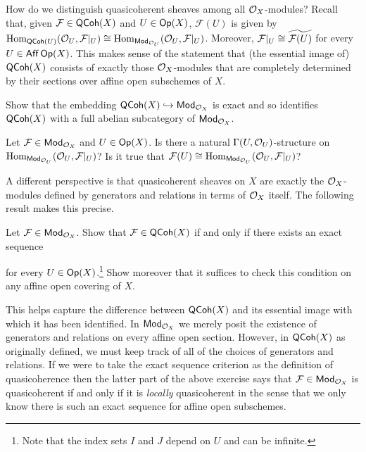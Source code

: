 \documentclass[11pt]{article}
\renewcommand{\F}{\mathcal{F}}
\begin{document}
How do we distinguish quasicoherent sheaves among all $\mathcal{O}_X$-modules? Recall that, given $\F\in\QCoh(X)$ and $U\in\operatorname{\mathsf{Op}}(X)$, $\F(U)$ is given by $\Hom_{\QCoh(U)}(\O_U,\F|_U)\iso\Hom_{\Mod_{\O_U}}(\O_U,\F|_U)$. Moreover, $\F|_U\iso\twid{\F(U)}$ for every $U\in\operatorname{\mathsf{Aff}}\operatorname{\mathsf{Op}}(X)$. This makes sense of the statement that (the essential image of) $\operatorname{\mathsf{QCoh}}(X)$ consists of exactly those $\mathcal{O}_X$-modules that are completely determined by their sections over affine open subschemes of $X$. 

\begin{exercise}
Show that the embedding $\operatorname{\mathsf{QCoh}}(X)\hookrightarrow\operatorname{\mathsf{Mod}}_{\mathcal{O}_X}$ is exact and so identifies $\operatorname{\mathsf{QCoh}}(X)$ with a full abelian subcategory of $\operatorname{\mathsf{Mod}}_{\mathcal{O}_X}$.
\end{exercise}

\begin{exercise}
Let $\F\in\Mod_{\O_X}$ and $U\in\operatorname{\mathsf{Op}}(X)$. Is there a natural $\Gamma(U,\mathcal{O}_U)$-structure on $\Hom_{\Mod_{\O_U}}(\O_U,\F|_U)$? Is it true that $\F(U)\iso\Hom_{\Mod_{\O_U}}(\O_U,\F|_U)$?
\end{exercise}

A different perspective is that quasicoherent sheaves on $X$ are exactly the $\mathcal{O}_X$-modules defined by generators and relations in terms of $\mathcal{O}_X$ itself. The following result makes this precise.

\begin{exercise}
Let $\F\in\Mod_{\O_X}$. Show that $\F\in\QCoh(X)$ if and only if there exists an exact sequence
\begin{center}
\end{center}
for every $U\in\operatorname{\mathsf{Op}}(X)$.\footnote{Note that the index sets $I$ and $J$ depend on $U$ and can be infinite.} Show moreover that it suffices to check this condition on any affine open covering of $X$.
\end{exercise}

This helps capture the difference between $\operatorname{\mathsf{QCoh}}(X)$ and its essential image with which it has been identified. In $\operatorname{\mathsf{Mod}}_{\mathcal{O}_X}$ we merely posit the existence of generators and relations on every affine open section. However, in $\operatorname{\mathsf{QCoh}}(X)$ as originally defined, we must keep track of all of the choices of generators and relations. If we were to take the exact sequence criterion as the definition of quasicoherence then the latter part of the above exercise says that $\F\in\Mod_{\O_X}$ is quasicoherent if and only if it is \emph{locally} quasicoherent in the sense that we only know there is such an exact sequence for affine open subschemes.
\end{document}
